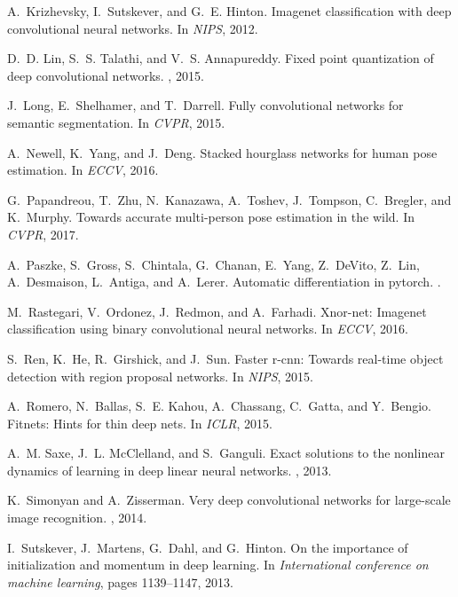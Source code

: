 \documentclass[10pt,twocolumn,letterpaper]{article}
\begin{document}
{\begin{thebibliography}{10}
A.~Krizhevsky, I.~Sutskever, and G.~E. Hinton.
\newblock Imagenet classification with deep convolutional neural networks.
\newblock In {\em NIPS}, 2012.

D.~D. Lin, S.~S. Talathi, and V.~S. Annapureddy.
\newblock Fixed point quantization of deep convolutional networks.
, 2015.

J.~Long, E.~Shelhamer, and T.~Darrell.
\newblock Fully convolutional networks for semantic segmentation.
\newblock In {\em CVPR}, 2015.

A.~Newell, K.~Yang, and J.~Deng.
\newblock Stacked hourglass networks for human pose estimation.
\newblock In {\em ECCV}, 2016.

G.~Papandreou, T.~Zhu, N.~Kanazawa, A.~Toshev, J.~Tompson, C.~Bregler, and
  K.~Murphy.
\newblock Towards accurate multi-person pose estimation in the wild.
\newblock In {\em CVPR}, 2017.

A.~Paszke, S.~Gross, S.~Chintala, G.~Chanan, E.~Yang, Z.~DeVito, Z.~Lin,
  A.~Desmaison, L.~Antiga, and A.~Lerer.
\newblock Automatic differentiation in pytorch.
.

M.~Rastegari, V.~Ordonez, J.~Redmon, and A.~Farhadi.
\newblock Xnor-net: Imagenet classification using binary convolutional neural
  networks.
\newblock In {\em ECCV}, 2016.

S.~Ren, K.~He, R.~Girshick, and J.~Sun.
\newblock Faster r-cnn: Towards real-time object detection with region proposal
  networks.
\newblock In {\em NIPS}, 2015.

A.~Romero, N.~Ballas, S.~E. Kahou, A.~Chassang, C.~Gatta, and Y.~Bengio.
\newblock Fitnets: Hints for thin deep nets.
\newblock In {\em ICLR}, 2015.

A.~M. Saxe, J.~L. McClelland, and S.~Ganguli.
\newblock Exact solutions to the nonlinear dynamics of learning in deep linear
  neural networks.
, 2013.

K.~Simonyan and A.~Zisserman.
\newblock Very deep convolutional networks for large-scale image recognition.
, 2014.

I.~Sutskever, J.~Martens, G.~Dahl, and G.~Hinton.
\newblock On the importance of initialization and momentum in deep learning.
\newblock In {\em International conference on machine learning}, pages
  1139--1147, 2013.


\end{thebibliography}}
\end{document}
